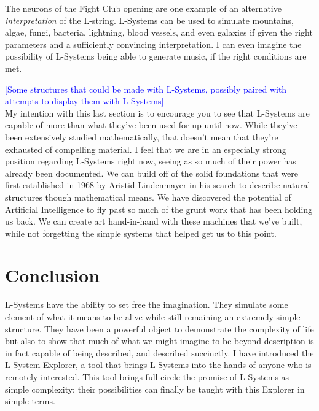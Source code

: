 \documentclass[12pt,twoside]{reedthesis}
\begin{document}
	The neurons of the Fight Club opening are one example of an alternative \textit{interpretation} of the L-string. L-Systems can be used to simulate mountains, algae, fungi, bacteria, lightning, blood vessels, and even galaxies if given the right parameters and a sufficiently convincing interpretation. I can even imagine the possibility of L-Systems being able to generate music, if the right conditions are met.
	
	\textcolor{blue}{[Some structures that could be made with L-Systems, possibly paired with attempts to display them with L-Systems]}\\
	
	My intention with this last section is to encourage you to see that L-Systems are capable of more than what they've been used for up until now. While they've been extensively studied mathematically, that doesn't mean that they're exhausted of compelling material. I feel that we are in an especially strong position regarding L-Systems right now, seeing as so much of their power has already been documented. We can build off of the solid foundations that were first established in 1968 by Aristid Lindenmayer in his search to describe natural structures though mathematical means. We have discovered the potential of Artificial Intelligence to fly past so much of the grunt work that has been holding us back. We can create art hand-in-hand with these machines that we've built, while not forgetting the simple systems that helped get us to this point.
	
\chapter{Conclusion}
	\setcounter{section}{0}
	
	L-Systems have the ability to set free the imagination. They simulate some element of what it means to be alive while still remaining an extremely simple structure. They have been a powerful object to demonstrate the complexity of life but also to show that much of what we might imagine to be beyond description is in fact capable of being described, and described succinctly. I have introduced the L-System Explorer, a tool that brings L-Systems into the hands of anyone who is remotely interested. This tool brings full circle the promise of L-Systems as simple complexity; their possibilities can finally be taught with this Explorer in simple terms.
	
\end{document}
